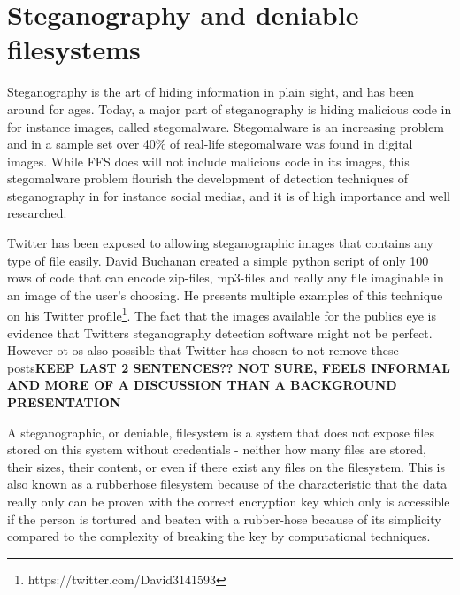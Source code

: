 \section{Steganography and deniable filesystems}
Steganography is the art of hiding information in plain sight, and has been around for ages. Today, a major part of steganography is hiding malicious code in for instance images, called stegomalware. Stegomalware is an increasing problem and in a sample set over 40\% of real-life stegomalware was found in digital images\cite{SIMARGLStegwarePrimer}. While FFS does will not include malicious code in its images, this stegomalware problem flourish the development of detection techniques of steganography in for instance social medias, and it is of high importance and well researched. 

Twitter has been exposed to allowing steganographic images that contains any type of file easily\cite{TwitterImagesCan}. David Buchanan created a simple python script of only 100 rows of code that can encode zip-files, mp3-files and really any file imaginable in an image of the user's choosing\cite{buchananTweetablepolyglotpng2022}. He presents multiple examples of this technique on his Twitter profile\footnote{https://twitter.com/David3141593}. The fact that the images available for the publics eye is evidence that Twitters steganography detection software might not be perfect. However ot os also possible that Twitter has chosen to not remove these posts\textbf{KEEP LAST 2 SENTENCES?? NOT SURE, FEELS INFORMAL AND MORE OF A DISCUSSION THAN A BACKGROUND PRESENTATION}

A steganographic, or deniable, filesystem is a system that does not expose files stored on this system without credentials - neither how many files are stored, their sizes, their content, or even if there exist any files on the filesystem\cite{petersDEFYDeniableFile2014}. This is also known as a rubberhose filesystem because of the characteristic that the data really only can be proven with the correct encryption key which only is accessible if the person is tortured and beaten with a rubber-hose because of its simplicity compared to the complexity of breaking the key by computational techniques.